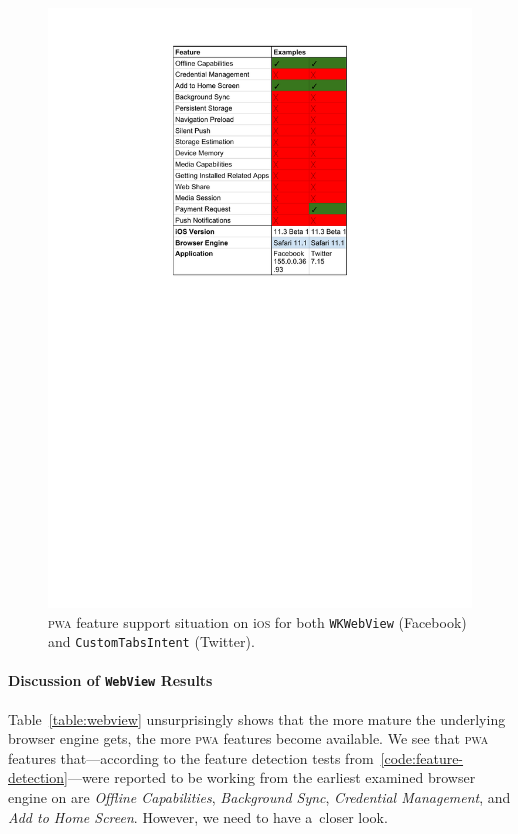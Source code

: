 \documentclass[sigconf]{acmart}
\begin{document}
\begin{figure}[t]
  \renewcommand{\figurename}{Table}
  \begin{center}
  \centerline{\includegraphics[width=.65\columnwidth,trim=4.3cm 16.4cm 4.3cm 1.5cm, clip]{ios-results.pdf}}
  \caption{\textsc{pwa} feature support situation on i\textsc{os} for both \texttt{WKWebView} (Facebook)
    and \texttt{CustomTabsIntent} (Twitter).}
  \label{table:safari}
  \end{center}
\end{figure}

\paragraph{\textbf{Discussion of \texttt{WebView} Results}}

Table~\ref{table:webview} unsurprisingly shows that the more mature
the underlying browser engine gets, the more \textsc{pwa} features become available.
We see that \textsc{pwa} features that---according to the feature detection tests
from~\autoref{code:feature-detection}---were reported to be working
from the earliest examined browser engine on are \emph{Offline Capabilities},
\emph{Background Sync}, \emph{Credential Management}, and \emph{Add to Home Screen}.
However, we need to have a~closer look.
\end{document}
